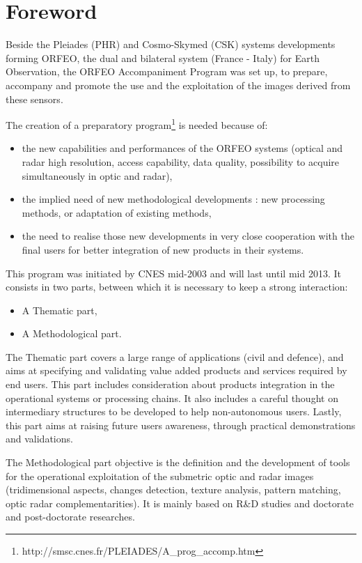 \chapter*{Foreword}
\noindent


Beside the Pleiades (PHR) and Cosmo-Skymed (CSK) systems developments
forming ORFEO, the dual and bilateral system (France - Italy) for
Earth Observation, the ORFEO Accompaniment Program was set up, to
prepare, accompany and promote the use and the exploitation of the
images derived from these sensors.

The creation of a preparatory
program\footnote{http://smsc.cnes.fr/PLEIADES/A\_prog\_accomp.htm} is
needed because of:
\begin{itemize}
\item the new capabilities and performances of the ORFEO systems
  (optical and radar high resolution, access capability, data quality,
  possibility to acquire simultaneously in optic and radar),
\item the implied need of new methodological developments : new
  processing methods, or adaptation of existing methods,
\item the need to realise those new developments in very close
  cooperation with the final users for better integration of new
  products in their systems.

\end{itemize}

This program was initiated by CNES mid-2003 and will last until mid
2013.  It consists in two parts, between which it is necessary to keep
a strong interaction:
\begin{itemize}
\item A Thematic part,
\item A Methodological part.
\end{itemize}

The Thematic part covers a large range of applications (civil and
defence), and aims at specifying and validating value added products
and services required by end users. This part includes consideration
about products integration in the operational systems or processing
chains. It also includes a careful thought on intermediary structures
to be developed to help non-autonomous users. Lastly, this part aims
at raising future users awareness, through practical demonstrations
and validations.

The Methodological part objective is the definition and the
development of tools for the operational exploitation of the
submetric optic and radar images (tridimensional aspects, changes
detection, texture analysis, pattern matching, optic radar
complementarities). It is mainly based on R\&D studies and doctorate
and post-doctorate researches.

